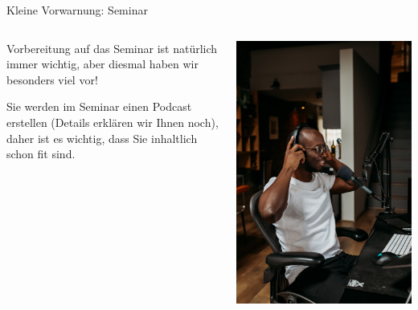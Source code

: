 \documentclass{beamer}
\begin{document}
\begin{frame}{Kleine Vorwarnung: Seminar}

\begin{columns}[c]
    \begin{column}{5cm}
       Vorbereitung auf das Seminar ist natürlich immer wichtig, aber diesmal haben wir besonders viel vor! 
       
       Sie werden im Seminar einen Podcast erstellen (Details erklären wir Ihnen noch), daher ist es wichtig, dass Sie inhaltlich schon fit sind. 
    \end{column}
    
    \begin{column}{5cm}
        \begin{center}
            \includegraphics[width=\textwidth]{convertkit-BOI9jki3nzY-unsplash.jpg}
        \end{center}
    \end{column}

\end{columns}

\end{frame}
\end{document}
